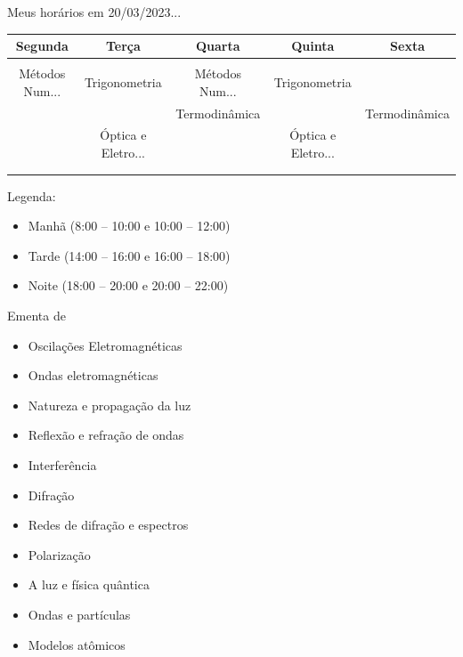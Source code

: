\begin{frame}{Meus horários em 20/03/2023...}
    \small{
        \begin{center}
            \begin{tabular}{ccccc}
                \rowcolor{black!10} Segunda & Terça & Quarta & Quinta & Sexta \\ \hline
                \rowcolor{red!25} &&&& \\ \hline
                \rowcolor{red!25} Métodos Num... & Trigonometria & Métodos Num... & Trigonometria & \\ \hline
                \rowcolor{green!25} & & Termodinâmica & & Termodinâmica \\ \hline
                \rowcolor{green!25} & Óptica e Eletro... & & Óptica e Eletro... & \\ \hline
                \rowcolor{blue!25} &&&& \\ \hline
                \rowcolor{blue!25} &&&& \\ \hline
            \end{tabular}
        \end{center}

        \vspace{1cm}
        Legenda:
        \begin{itemize}
            \item[\textcolor{red!25}{\rule{1em}{1em}}] Manhã (8:00 -- 10:00 e 10:00 -- 12:00)
            \item[\textcolor{green!25}{\rule{1em}{1em}}] Tarde (14:00 -- 16:00 e 16:00 -- 18:00)
            \item[\textcolor{blue!25}{\rule{1em}{1em}}] Noite (18:00 -- 20:00 e 20:00 -- 22:00)
        \end{itemize}
    }
\end{frame}

\begin{frame}{Ementa de \Disciplina}
    \begin{itemize}
        \item Oscilações Eletromagnéticas
        \item Ondas eletromagnéticas
        \item Natureza e propagação da luz
        \item Reflexão e refração de ondas
        \item Interferência
        \item Difração
        \item Redes de difração e espectros
        \item Polarização
        \item A luz e física quântica
        \item Ondas e partículas
        \item Modelos atômicos
    \end{itemize}
\end{frame}

